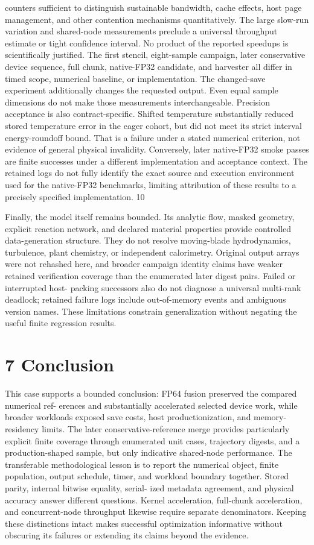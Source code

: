 \documentclass[11pt]{article}
\begin{document}
counters sufficient to distinguish sustainable bandwidth, cache effects, host page management,
and other contention mechanisms quantitatively. The large slow-run variation and shared-node
measurements preclude a universal throughput estimate or tight confidence interval.
No product of the reported speedups is scientifically justified. The first stencil, eight-sample
campaign, later conservative device sequence, full chunk, native-FP32 candidate, and harvester
all differ in timed scope, numerical baseline, or implementation. The changed-save experiment
additionally changes the requested output. Even equal sample dimensions do not make those
measurements interchangeable.
Precision acceptance is also contract-specific. Shifted temperature substantially reduced stored
temperature error in the eager cohort, but did not meet its strict interval energy-roundoff bound.
That is a failure under a stated numerical criterion, not evidence of general physical invalidity.
Conversely, later native-FP32 smoke passes are finite successes under a different implementation
and acceptance context. The retained logs do not fully identify the exact source and execution
environment used for the native-FP32 benchmarks, limiting attribution of these results to a precisely
specified implementation.
10

Finally, the model itself remains bounded. Its analytic flow, masked geometry, explicit reaction
network, and declared material properties provide controlled data-generation structure. They do
not resolve moving-blade hydrodynamics, turbulence, plant chemistry, or independent calorimetry.
Original output arrays were not rehashed here, and broader campaign identity claims have weaker
retained verification coverage than the enumerated later digest pairs. Failed or interrupted host-
packing successors also do not diagnose a universal multi-rank deadlock; retained failure logs include
out-of-memory events and ambiguous version names. These limitations constrain generalization
without negating the useful finite regression results.

\section*{7 Conclusion}

This case supports a bounded conclusion: FP64 fusion preserved the compared numerical ref-
erences and substantially accelerated selected device work, while broader workloads exposed save
costs, host productionization, and memory-residency limits. The later conservative-reference merge
provides particularly explicit finite coverage through enumerated unit cases, trajectory digests, and
a production-shaped sample, but only indicative shared-node performance.
The transferable methodological lesson is to report the numerical object, finite population, output
schedule, timer, and workload boundary together. Stored parity, internal bitwise equality, serial-
ized metadata agreement, and physical accuracy answer different questions. Kernel acceleration,
full-chunk acceleration, and concurrent-node throughput likewise require separate denominators.
Keeping these distinctions intact makes successful optimization informative without obscuring its
failures or extending its claims beyond the evidence.
\end{document}
